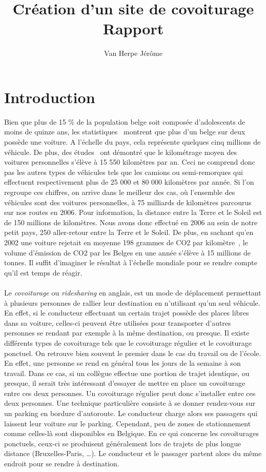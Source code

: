 \documentclass[12pt, a4paper, oneside]{article}
\title{Création d'un site de covoiturage\\ \bigskip{} Rapport}
\author{Van Herpe Jérôme}
\begin{document}
\maketitle
\newpage
\null
\newpage
\renewcommand{\leftmark}{TABLE DES MATI\`{E}RES}
\thispagestyle{fancy}
\tableofcontents
\newpage
\section{Introduction}
    Bien que plus de 15 $\%$ de la population belge soit composée d'adolescents de moins de quinze ans, les statistiques~\cite{stats-mondiale} montrent que plus d'un belge sur deux possède une voiture. A l'échelle du pays, cela représente quelques cinq millions de véhicule. De plus, des études~\cite{stats-ecologie} ont démontré que le kilométrage moyen des voitures personnelles s'élève à 15 550 kilomètres par an. Ceci ne comprend donc pas les autres types de véhicules tels que les camions ou semi-remorques qui effectuent respectivement plus de 25 000 et 80 000 kilomètres par année. Si l'on regroupe ces chiffres, on arrive dans le meilleur des cas, où l'ensemble des véhicules sont des voitures personnelles, à 75 milliards de kilomètres parcourus sur nos routes en 2006. Pour information, la distance entre la Terre et le Soleil est de 150 millions de kilomètres. Nous avons donc effectué en 2006 au sein de notre petit pays, 250 aller-retour entre la Terre et le Soleil. De plus, en sachant qu'en 2002 une voiture rejetait en moyenne 198 grammes de CO2 par kilomètre~\cite{stats-co2}, le volume d'émission de CO2 par les Belges en une année s'élève à 15 millions de tonnes. Il suffit d'imaginer le résultat à l'échelle mondiale pour se rendre compte qu'il est temps de réagir.\\\\
    \indent Le \textit{covoiturage} ou \textit{ridesharing} en anglais, est un mode de déplacement permettant à plusieurs personnes de rallier leur destination en n'utilisant qu'un seul véhicule. En effet, si le conducteur effectuant un certain trajet possède des places libres dans sa voiture, celles-ci peuvent être utilisées pour transporter d'autres personnes se rendant par exemple à la même destination, ou presque. Il existe différents types de covoiturage tels que le covoiturage régulier et le covoiturage ponctuel. On retrouve bien souvent le premier dans le cas du travail ou de l'école. En effet, une personne se rend en général tous les jours de la semaine à son travail. Dans ce cas, si un collègue effectue une portion de trajet identique, ou presque, il serait très intéressant d'essayer de mettre en place un covoiturage entre ces deux personnes. Un covoiturage régulier peut donc s'installer entre ces deux personnes. Une technique particulière consiste à se donner rendez-vous sur un parking en bordure d'autoroute. Le conducteur charge alors ses passagers qui laissent leur voiture sur le parking. Cependant, peu de zones de stationnement comme celles-là sont disponibles en Belgique. En ce qui concerne les covoiturages ponctuels, ceux-ci se produisent généralement lors de trajets de plus longue distance (Bruxelles-Paris, \dots). Le conducteur et le passager partent alors du même endroit pour se rendre à destination.\\\\
\end{document}
